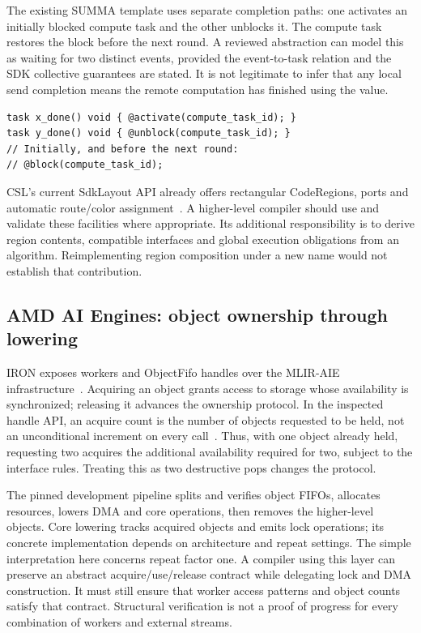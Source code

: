 \documentclass[final,3p,times,authoryear]{elsarticle}
\begin{document}
The existing SUMMA template uses separate completion paths: one activates an initially blocked compute task and the other unblocks it. The compute task restores the block before the next round. A reviewed abstraction can model this as waiting for two distinct events, provided the event-to-task relation and the SDK collective guarantees are stated. It is not legitimate to infer that any local send completion means the remote computation has finished using the value.


\begin{lstlisting}[float=htbp,caption={Actual completion handlers in the companion CSL template; initialization and the compute body are omitted.}]
task x_done() void { @activate(compute_task_id); }
task y_done() void { @unblock(compute_task_id); }
// Initially, and before the next round:
// @block(compute_task_id);
\end{lstlisting}


CSL's current SdkLayout API already offers rectangular CodeRegions, ports and automatic route/color assignment~\citep{cslregions2026}. A higher-level compiler should use and validate these facilities where appropriate. Its additional responsibility is to derive region contents, compatible interfaces and global execution obligations from an algorithm. Reimplementing region composition under a new name would not establish that contribution.

\subsection{AMD AI Engines: object ownership through lowering}
IRON exposes workers and ObjectFifo handles over the MLIR-AIE infrastructure~\citep{iron2025}. Acquiring an object grants access to storage whose availability is synchronized; releasing it advances the ownership protocol. In the inspected handle API, an acquire count is the number of objects requested to be held, not an unconditional increment on every call~\citep{aiesource2026}. Thus, with one object already held, requesting two acquires the additional availability required for two, subject to the interface rules. Treating this as two destructive pops changes the protocol.

The pinned development pipeline splits and verifies object FIFOs, allocates resources, lowers DMA and core operations, then removes the higher-level objects. Core lowering tracks acquired objects and emits lock operations; its concrete implementation depends on architecture and repeat settings. The simple interpretation here concerns repeat factor one. A compiler using this layer can preserve an abstract acquire/use/release contract while delegating lock and DMA construction. It must still ensure that worker access patterns and object counts satisfy that contract. Structural verification is not a proof of progress for every combination of workers and external streams.
\end{document}
